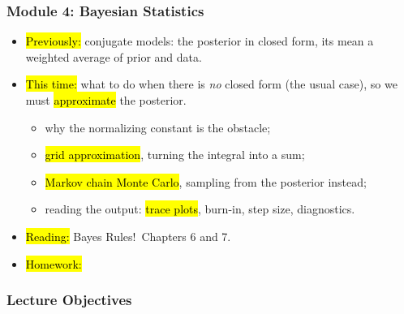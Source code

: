 

\begin{frame}
\frametitle{Module 4: Bayesian Statistics}
    \begin{itemize}
        \item \hl{Previously:} conjugate models: the posterior in closed form, its mean a weighted average of prior and data.
        \item \hl{This time:} what to do when there is \emph{no} closed form (the usual case), so we must \hl{approximate} the posterior.
          \begin{itemize}
              \item why the normalizing constant is the obstacle;
              \item \hl{grid approximation}, turning the integral into a sum;
              \item \hl{Markov chain Monte Carlo}, sampling from the posterior instead;
              \item reading the output: \hl{trace plots}, burn-in, step size, diagnostics.
          \end{itemize}
        \item \hl{Reading:} Bayes Rules!\ Chapters 6 and 7.
        \item \hl{Homework:}
    \end{itemize}
\end{frame}


\begin{frame}
    \frametitle{Lecture Objectives}
\end{frame}


